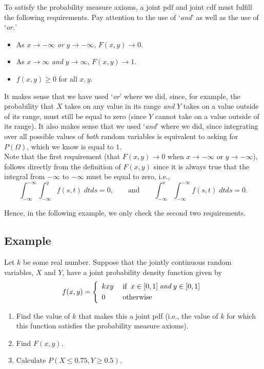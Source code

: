 \noindent To satisfy the probability measure axioms, a joint pdf and joint cdf must fulfill the following requirements. Pay attention to the use of `\textit{and}' as well as the use of `\textit{or.}'
\begin{itemize}
\item As $x \rightarrow -\infty$ \textit{or} $y \rightarrow -\infty$, $F(x,y) \rightarrow 0$.
\item As $x \rightarrow \infty$ \textit{and} $y \rightarrow \infty$, $F(x,y) \rightarrow 1$.
\item $f(x,y) \geq 0$ for all $x,y$.
\end{itemize}
It makes sense that we have used `\textit{or}' where we did, since, for example, the probability that $X$ takes on any value in its range \textit{and} $Y$ takes on a value outside of its range, must still be equal to zero (since $Y$ cannot take on a value outside of its range). It also makes sense that we used `\textit{and}' where we did, since integrating over all possible values of \textit{both} random variables is equivalent to asking for $P(\Omega)$, which we know is equal to $1$. \\

\noindent Note that the first requirement (that $F(x,y) \rightarrow 0$ when $x \rightarrow -\infty$ or $y \rightarrow -\infty$), follows directly from the definition of $F(x,y)$ since it is always true that the integral from $-\infty$ to $-\infty$ must be equal to zero, i.e.,
\[
\int_{-\infty}^{-\infty} \int_{-\infty}^y f(s,t) \; dtds = 0, \qquad \text{and} \qquad \int_{-\infty}^x \int_{-\infty}^{-\infty} f(s,t) \; dt ds = 0.
\]

\noindent Hence, in the following example, we only check the second two requirements.

\subsection{Example} \label{ex27.1}
Let $k$ be some real number. Suppose that the jointly continuous random variables, $X$ and $Y$, have a joint probability density function given by
\[
f(x,y) = \left\{ \begin{array}{ll}
kxy & \; \text{if} \;\; x \in [0,1] \; \textit{and} \; y \in [0,1] \smallskip \\
0 & \; \text{otherwise}
\end{array} \right.
\]
\begin{enumerate}
\item Find the value of $k$ that makes this a joint pdf (i.e., the value of $k$ for which this function satisfies the probability measure axioms).
\item Find $F(x,y)$.
\item Calculate $P(X \leq 0.75, Y \geq 0.5)$.
\end{enumerate}
\bigskip


